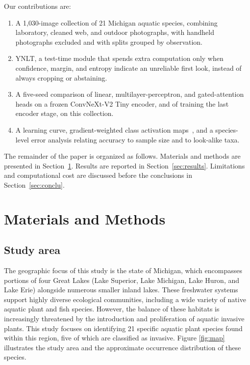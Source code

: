 \documentclass[final,3p,times,twocolumn]{elsarticle}
\begin{document}
Our contributions are:
\begin{enumerate}
\item A 1{,}030-image collection of 21 Michigan aquatic species, combining laboratory, cleaned web, and outdoor photographs, with handheld photographs excluded and with splits grouped by observation.
\item YNLT, a test-time module that spends extra computation only when confidence, margin, and entropy indicate an unreliable first look, instead of always cropping or abstaining.
\item A five-seed comparison of linear, multilayer-perceptron, and gated-attention heads on a frozen ConvNeXt-V2 Tiny encoder, and of training the last encoder stage, on this collection.
\item A learning curve, gradient-weighted class activation maps~\cite{selvaraju2017gradcam}, and a species-level error analysis relating accuracy to sample size and to look-alike taxa.
\end{enumerate}

The remainder of the paper is organized as follows. Materials and methods are presented in Section~\ref{sec:materials_methods}. Results are reported in Section~\ref{sec:results}. Limitations and computational cost are discussed before the conclusions in Section~\ref{sec:conclu}.


\section{Materials and Methods}
\label{sec:materials_methods}

\subsection{Study area}
\label{subsec:study_area}

The geographic focus of this study is the state of Michigan, which encompasses portions of four Great Lakes (Lake Superior, Lake Michigan, Lake Huron, and Lake Erie) alongside numerous smaller inland lakes. These freshwater systems support highly diverse ecological communities, including a wide variety of native aquatic plant and fish species. However, the balance of these habitats is increasingly threatened by the introduction and proliferation of aquatic invasive plants. This study focuses on identifying 21 specific aquatic plant species found within this region, five of which are classified as invasive. Figure \ref{fig:map} illustrates the study area and the approximate occurrence distribution of these species.
\end{document}
